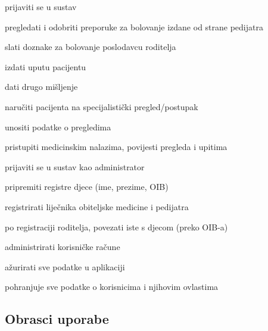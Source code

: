 \begin{packed_enum}
                \item  {}
				\begin{packed_enum}
					\item prijaviti se u sustav
                    \item pregledati i odobriti preporuke za bolovanje izdane od strane pedijatra 
					\item slati doznake za bolovanje poslodavcu roditelja
					\item izdati uputu pacijentu
                    \item dati drugo mišljenje
                    \item naručiti pacijenta na specijalistički pregled/postupak
                    \item unositi podatke o pregledima
                    \item pristupiti medicinskim nalazima, povijesti pregleda i upitima 
				\end{packed_enum}
    
                \item  {}
				\begin{packed_enum}
                    \item prijaviti se u sustav kao administrator
					\item pripremiti registre djece (ime, prezime, OIB)
                    \item registrirati liječnika obiteljske medicine i pedijatra
                    \item po registraciji roditelja, povezati iste s djecom (preko OIB-a)
					\item administrirati korisničke račune
                    \item ažurirati sve podatke u aplikaciji
				\end{packed_enum}

                \item  {}
				\begin{packed_enum}
                    \item pohranjuje sve podatke o korisnicima i njihovim ovlastima
				\end{packed_enum}
			\end{packed_enum}
			
			\eject 
				
			\subsection{Obrasci uporabe}
				
